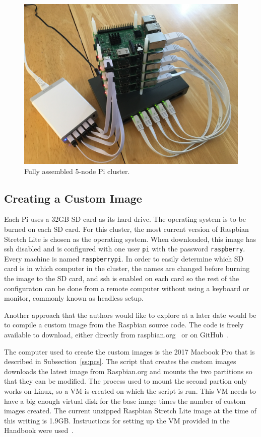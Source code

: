 \begin{figure}[!ht]
  \centering\includegraphics[width=\columnwidth]{images/complete-pi-cluster.jpg}
  \caption{Fully assembled 5-node Pi cluster.}\label{f:complete-cluster}
\end{figure}

\subsection{Creating a Custom Image}
Each Pi uses a 32GB SD card as its hard drive. The operating system is
to be burned on each SD card. For this cluster, the most current
version of Raspbian Stretch Lite is chosen as the operating
system. When downloaded, this image has ssh disabled and is configured
with one user \verb|pi| with the password \verb|raspberry|. Every
machine is named \verb|raspberrypi|. In order to easily determine
which SD card is in which computer in the cluster, the names are
changed before burning the image to the SD card, and ssh is enabled on
each card so the rest of the configuraton can be done from a remote
computer without using a keyboard or monitor, commonly known as
headless setup.

Another approach that the authors would like to explore at a later
date would be to compile a custom image from the Raspbian source
code. The code is freely available to download, either directly from
raspbian.org~\cite{hid-sp18-419-raspbian-distro} or on
GitHub~\cite{hid-sp18-419-pi-gen}.

The computer used to create the custom images is the 2017 Macbook Pro
that is described in Subsection~\ref{ss:pcs}. The script that creates
the custom images downloads the latest image from Raspbian.org and
mounts the two partitions so that they can be modified. The process
used to mount the second partion only works on Linux, so a VM is
created on which the script is run. This VM needs to have a big enough
virtual disk for the base image times the number of custom images
created. The current unzipped Raspbian Stretch Lite image at the time
of this writing is 1.9GB. Instructions for setting up the VM provided
in the Handbook were used~\cite{las18handbook}.

